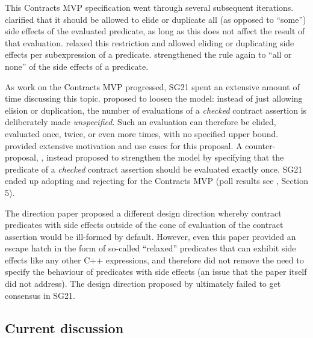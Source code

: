 This Contracts MVP specification went through several subsequent iterations. \cite{P2388R0} clarified that it should be allowed to elide or duplicate all (as opposed to ``some'') side effects of the evaluated predicate, as long as this does not affect the result of that evaluation. \cite{P2388R3} relaxed this restriction and allowed eliding or duplicating side effects per subexpression of a predicate. \cite{P2521R5} strengthened the rule again to ``all or none'' of the side effects of a predicate.

As work on the Contracts MVP progressed, SG21 spent an extensive amount of time discussing this topic. \cite{P2751R1} proposed to loosen the \cite{P2521R5} model: instead of just allowing elision or duplication, the number of evaluations of a \emph{checked} contract assertion is deliberately made \emph{unspecified}. Such an evaluation can therefore be elided, evaluated once, twice, or even more times, with no specified upper bound. \cite{P2751R1} provided extensive motivation and use cases for this proposal. A counter-proposal, \cite{P2756R0}, instead proposed to strengthen the \cite{P2521R5} model by specifying that the predicate of a \emph{checked} contract assertion should be evaluated exactly once. SG21 ended up adopting  \cite{P2751R1} and rejecting \cite{P2756R0} for the Contracts MVP (poll results see \cite{P2751R1}, Section 5).

The direction paper \cite{P2680R1} proposed a different design direction whereby contract predicates with side effects outside of the cone of evaluation of the contract assertion would be ill-formed by default. However, even this paper provided an escape hatch in the form of so-called ``relaxed'' predicates that can exhibit side effects like any other C++ expressions, and therefore did not remove the need to specify the behaviour of predicates with side effects (an issue that the paper itself did not address). The design direction proposed by \cite{P2680R1} ultimately failed to get consensus in SG21.

\subsection{Current discussion}

